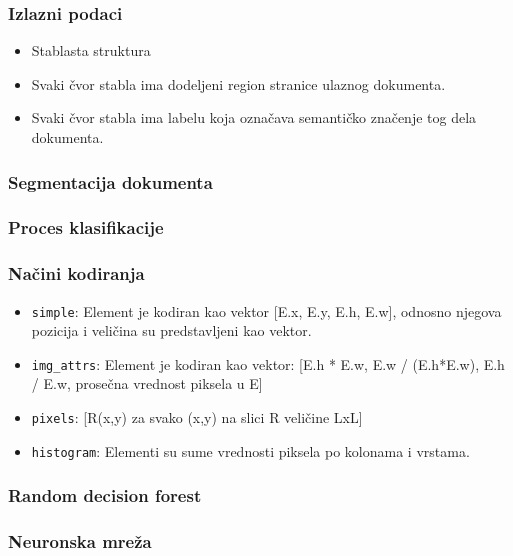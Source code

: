 \documentclass{beamer}
\begin{document}
\begin{frame}
	\frametitle{Izlazni podaci}
	\begin{itemize}
		\item Stablasta struktura
		\item Svaki čvor stabla ima dodeljeni region stranice ulaznog dokumenta. 
		\item Svaki čvor stabla ima labelu koja označava semantičko značenje tog dela dokumenta. 
	\end{itemize}
\end{frame}


\begin{frame}
	\frametitle{Segmentacija dokumenta}


\end{frame}

\begin{frame}
	\frametitle{Proces klasifikacije}

\end{frame}

\begin{frame}
	\frametitle{Načini kodiranja}
	\begin{itemize}
		\item \texttt{simple}: Element je kodiran kao vektor [E.x, E.y, E.h, E.w], odnosno njegova pozicija i veličina su predstavljeni kao vektor.
		\item \texttt{img\_attrs}: Element je kodiran kao vektor:  [E.h * E.w, E.w / (E.h*E.w), E.h / E.w, prosečna vrednost piksela u E]
		\item \texttt{pixels}: [R(x,y) za svako (x,y) na slici R veličine LxL]
		\item \texttt{histogram}: Elementi su sume vrednosti piksela po kolonama i vrstama.
	\end{itemize}
\end{frame}


\begin{frame}
	\frametitle{Random decision forest}

\end{frame}

\begin{frame}
	\frametitle{Neuronska mreža}

\end{frame}
\end{document}
